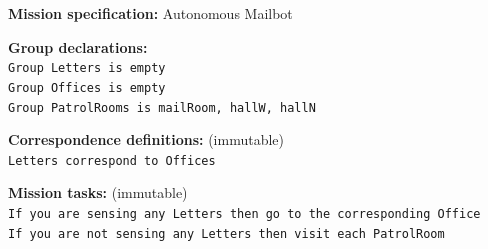 \begin{algorithm}
	\textbf{Mission specification:} Autonomous Mailbot
	
	\vspace{-7 pt}
	\hrulefill
	{\small
	
	\textbf{Group declarations:}\\
	\texttt{Group Letters is empty} \\
	\texttt{Group Offices is empty} \\
	\texttt{Group PatrolRooms is mailRoom, hallW, hallN}
	
	\textbf{Correspondence definitions:} (immutable)\\ %
	\texttt{Letters correspond to Offices}
	
	
	\textbf{Mission tasks:} (immutable)\\
	\texttt{If you are sensing any Letters then go to the corresponding Office}\\
	\texttt{If you are not sensing any Letters then visit each PatrolRoom}
	
	
	
}
\end{algorithm}
